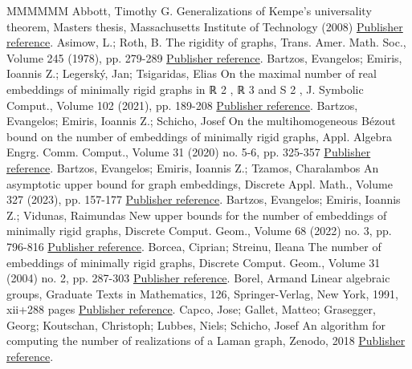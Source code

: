 \documentclass[11pt]{article}
\theoremstyle{definition}
\numberwithin{equation}{section}
\begin{document}
\begin{thebibliography}{MMMMMM}
 Abbott, Timothy G. Generalizations of Kempe’s universality theorem, Masters thesis, Massachusetts Institute of Technology (2008) \href{https://alco.centre-mersenne.org/articles/10.5802/alco.390/#Abbot}{Publisher reference}.
 Asimow, L.; Roth, B. The rigidity of graphs, Trans. Amer. Math. Soc., Volume 245 (1978), pp. 279-289 \href{https://alco.centre-mersenne.org/articles/10.5802/alco.390/#AsimowRothI}{Publisher reference}.
 Bartzos, Evangelos; Emiris, Ioannis Z.; Legerský, Jan; Tsigaridas, Elias On the maximal number of real embeddings of minimally rigid graphs in ℝ 2 , ℝ 3  and S 2 , J. Symbolic Comput., Volume 102 (2021), pp. 189-208 \href{https://alco.centre-mersenne.org/articles/10.5802/alco.390/#Bartzos2021}{Publisher reference}.
 Bartzos, Evangelos; Emiris, Ioannis Z.; Schicho, Josef On the multihomogeneous Bézout bound on the number of embeddings of minimally rigid graphs, Appl. Algebra Engrg. Comm. Comput., Volume 31 (2020) no. 5-6, pp. 325-357 \href{https://alco.centre-mersenne.org/articles/10.5802/alco.390/#Bartzos2020}{Publisher reference}.
 Bartzos, Evangelos; Emiris, Ioannis Z.; Tzamos, Charalambos An asymptotic upper bound for graph embeddings, Discrete Appl. Math., Volume 327 (2023), pp. 157-177 \href{https://alco.centre-mersenne.org/articles/10.5802/alco.390/#Bartzos2023}{Publisher reference}.
 Bartzos, Evangelos; Emiris, Ioannis Z.; Vidunas, Raimundas New upper bounds for the number of embeddings of minimally rigid graphs, Discrete Comput. Geom., Volume 68 (2022) no. 3, pp. 796-816 \href{https://alco.centre-mersenne.org/articles/10.5802/alco.390/#BartzosUpperBound}{Publisher reference}.
 Borcea, Ciprian; Streinu, Ileana The number of embeddings of minimally rigid graphs, Discrete Comput. Geom., Volume 31 (2004) no. 2, pp. 287-303 \href{https://alco.centre-mersenne.org/articles/10.5802/alco.390/#BorceaStreinu}{Publisher reference}.
 Borel, Armand Linear algebraic groups, Graduate Texts in Mathematics, 126, Springer-Verlag, New York, 1991, xii+288 pages \href{https://alco.centre-mersenne.org/articles/10.5802/alco.390/#borel91}{Publisher reference}.
 Capco, Jose; Gallet, Matteo; Grasegger, Georg; Koutschan, Christoph; Lubbes, Niels; Schicho, Josef An algorithm for computing the number of realizations of a Laman graph, Zenodo, 2018 \href{https://alco.centre-mersenne.org/articles/10.5802/alco.390/#ZenodoAlg}{Publisher reference}.

\end{thebibliography}
\end{document}
